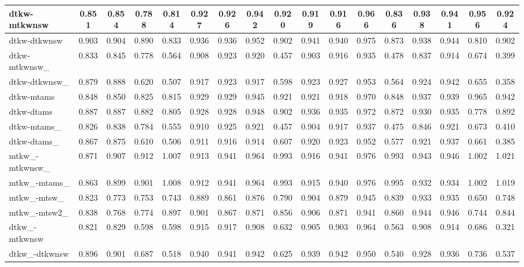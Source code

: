 \documentclass[%
 aip,
 jmp,%
 amsmath,amssymb,
 reprint,%
 floatfix,
]{revtex4-1}
\begin{document}
\begin{longtable*}{|p{2cm}||c|c|c|c|| c|c|c|c|| c|c|c|c|| c|c|c|c|}
dtkw-mtkwnsw & 0.851 & 0.854 & 0.788 & 0.814 & 0.927 & 0.926 & 0.942 & 0.920 & 0.919 & 0.916 & 0.966 & 0.836 & 0.938 & 0.941 & 0.956 & 0.924 \\ \hline
dtkw-dtkwnsw & 0.903 & 0.904 & 0.890 & 0.833 & 0.936 & 0.936 & 0.952 & 0.902 & 0.941 & 0.940 & 0.975 & 0.873 & 0.938 & 0.944 & 0.810 & 0.902 \\ \hline
dtkw-mtkwnsw\_ & 0.833 & 0.845 & 0.778 & 0.564 & 0.908 & 0.923 & 0.920 & 0.457 & 0.903 & 0.916 & 0.935 & 0.478 & 0.837 & 0.914 & 0.674 & 0.399 \\ \hline
dtkw-dtkwnsw\_ & 0.879 & 0.888 & 0.620 & 0.507 & 0.917 & 0.923 & 0.917 & 0.598 & 0.923 & 0.927 & 0.953 & 0.564 & 0.924 & 0.942 & 0.655 & 0.358 \\ \hline
dtkw-mtams & 0.848 & 0.850 & 0.825 & 0.815 & 0.929 & 0.929 & 0.945 & 0.921 & 0.921 & 0.918 & 0.970 & 0.848 & 0.937 & 0.939 & 0.965 & 0.942 \\ \hline
dtkw-dtams & 0.887 & 0.887 & 0.882 & 0.805 & 0.928 & 0.928 & 0.948 & 0.902 & 0.936 & 0.935 & 0.972 & 0.872 & 0.930 & 0.935 & 0.778 & 0.892 \\ \hline
dtkw-mtams\_ & 0.826 & 0.838 & 0.784 & 0.555 & 0.910 & 0.925 & 0.921 & 0.457 & 0.904 & 0.917 & 0.937 & 0.475 & 0.846 & 0.921 & 0.673 & 0.410 \\ \hline
dtkw-dtams\_ & 0.867 & 0.875 & 0.610 & 0.506 & 0.911 & 0.916 & 0.914 & 0.607 & 0.920 & 0.923 & 0.952 & 0.577 & 0.921 & 0.937 & 0.661 & 0.385 \\ \hline
mtkw\_-mtkwnsw\_ & 0.871 & 0.907 & 0.912 & 1.007 & 0.913 & 0.941 & 0.964 & 0.993 & 0.916 & 0.941 & 0.976 & 0.993 & 0.943 & 0.946 & 1.002 & 1.021 \\ \hline
mtkw\_-mtams\_ & 0.863 & 0.899 & 0.901 & 1.008 & 0.912 & 0.941 & 0.964 & 0.993 & 0.915 & 0.940 & 0.976 & 0.995 & 0.932 & 0.934 & 1.002 & 1.019 \\ \hline
mtkw\_-mtsw\_ & 0.823 & 0.773 & 0.753 & 0.743 & 0.889 & 0.861 & 0.876 & 0.790 & 0.904 & 0.879 & 0.945 & 0.839 & 0.933 & 0.935 & 0.650 & 0.748 \\ \hline
mtkw\_-mtsw2\_ & 0.838 & 0.768 & 0.774 & 0.897 & 0.901 & 0.867 & 0.871 & 0.856 & 0.906 & 0.871 & 0.941 & 0.860 & 0.944 & 0.946 & 0.744 & 0.844 \\ \hline
dtkw\_-mtkwnsw & 0.821 & 0.829 & 0.598 & 0.598 & 0.915 & 0.917 & 0.908 & 0.632 & 0.905 & 0.903 & 0.964 & 0.563 & 0.908 & 0.914 & 0.686 & 0.321 \\ \hline
dtkw\_-dtkwnsw & 0.896 & 0.901 & 0.687 & 0.518 & 0.940 & 0.941 & 0.942 & 0.625 & 0.939 & 0.942 & 0.950 & 0.540 & 0.928 & 0.936 & 0.736 & 0.537 \\ \hline

\end{longtable*}
\end{document}
